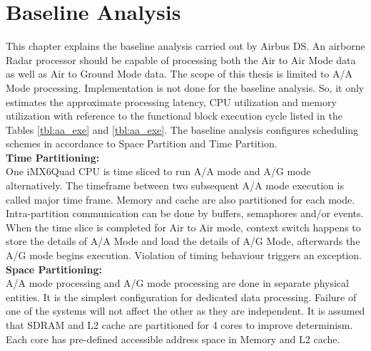 \chapter{Baseline Analysis}
\label{chap:existing_analysis}
This chapter explains the baseline analysis carried out by Airbus DS\cite{fcas}. An airborne Radar processor should be capable of processing both the Air to Air Mode data as well as Air to Ground Mode data. The scope of this thesis is limited to A/A Mode processing. Implementation is not done for the baseline analysis. So, it only estimates the approximate processing latency, CPU utilization and memory utilization with reference to the functional block execution cycle listed in the Tables \ref{tbl:aa_exe} and \ref{tbl:aa_exe}. The baseline analysis configures scheduling schemes in accordance to Space Partition and Time Partition.
\vspace*{2mm} \\
\noindent
\textbf{Time Partitioning:}\\
One iMX6Quad CPU is time sliced to run A/A mode and A/G mode alternatively. The timeframe between two subsequent A/A mode execution is called major time frame. Memory and cache are also partitioned for each mode. Intra-partition communication can be done by buffers, semaphores and/or events. When the time slice is completed for Air to Air mode, context switch happens to store the details of A/A Mode and load the details of A/G Mode, afterwards the A/G mode begins execution. Violation of timing behaviour triggers an exception. 
\vspace*{2mm} \\
\noindent
\textbf{Space Partitioning:} \\
A/A mode processing and A/G mode processing are done in separate physical entities. It is the simplest configuration for dedicated data processing. Failure of one of the systems will not affect the other as they are independent. It is assumed that SDRAM and L2 cache are partitioned for 4 cores to improve determinism. Each core has pre-defined accessible address space in Memory and L2 cache. 

